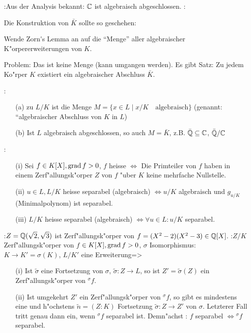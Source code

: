 \example{}:{Aus der Analysis bekannt: $\mathbb C$ ist algebraisch abgeschlossen.}
:{
 Die Konstruktion von $\bar{K}$ sollte so geschehen:
 
 Wende Zorn{\'{}}s Lemma an auf die ``Menge'' aller algebraischer K"orpererweiterungen von $K$.
 
 Problem: Das ist keine Menge (kann umgangen werden). Es gibt Satz:
 Zu jedem Ko"rper $K$ existiert ein algebraischer Abschluss $\bar{K}$.}
\remark{}:{\begin{enumerate}
  \item[(a)] zu $L/K$ ist die Menge $M=\{x\in L\mid x/K \quad\text{algebraisch} \}$
  (genannt: ``algebraischer Abschluss von $K$ in $L$)
  \item[(b)] Ist $L$ algebraisch abgeschlossen, so auch $M=\bar{K}$, z.B. 
  $\bar{\mathbb Q}\subseteq \mathbb C$, $\bar{\mathbb Q}/\mathbb C$
\end{enumerate}} 
:{\begin{enumerate}
   \item[(i)] Sei $f\in K[X], \operatorname{grad} f>0$, $f$ heisse  $\iff$
   Die Primteiler von $f$ haben in einem Zerf"allungsk"orper $Z$ von $f$ "uber $K$ 
   keine mehrfache Nullstelle.
   \item[(ii)] $u\in L, L/K$ heisse separabel (algebraisch) $\iff u/K$ algebraisch
   und $g_{u/K}$ (Minimalpolynom) ist separabel. 
   \item[(iii)] $L/K$ heisse separabel (algebraisch) $\iff \forall u\in L: u/K$ separabel. 
 \end{enumerate}}
\example{}:{$Z=\mathbb Q(\sqrt{2},\sqrt{3})$ ist Zerf"allungsk"orper von $f=(X^2-2)(X^2-3)\in 
 \mathbb Q[X]$.}
:{$Z/K$ Zerf"allungsk"orper von $f$
 $\in K[X], \operatorname{grad} f>0$, $\sigma$ Isomorphismus: $K\longrightarrow K'=\sigma(K)$,
 $L/K'$ eine Erweiterung}=>{
 \label{the_fortsetz_fuer_zerfaellungsk}
 \begin{enumerate}
   \item[(i)] Ist $\tilde{\sigma}$ eine Fortsetzung von $\sigma$, $\tilde{\sigma}:Z\longrightarrow L$,
   so ist $Z'=\tilde{\sigma}(Z)$ ein Zerf"allungsk"orper von ${}^{\sigma}f$.
   \item[(ii)] Ist umgekehrt $Z'$ ein Zerf"allungsk"orper von ${}^{\sigma}f$, so 
   gibt es mindestens eine und h"ochstens $\tilde{n}=(Z:K)$ Fortsetzung 
   $\tilde{\sigma}:Z\longrightarrow Z'$ von $\sigma$. Letzterer Fall tritt genau dann ein, wenn
   ${}^{\sigma}f$ separabel ist. Demn"achst : $f$ separabel $\iff{}^{\sigma}f$ separabel.
 \end{enumerate}}  
